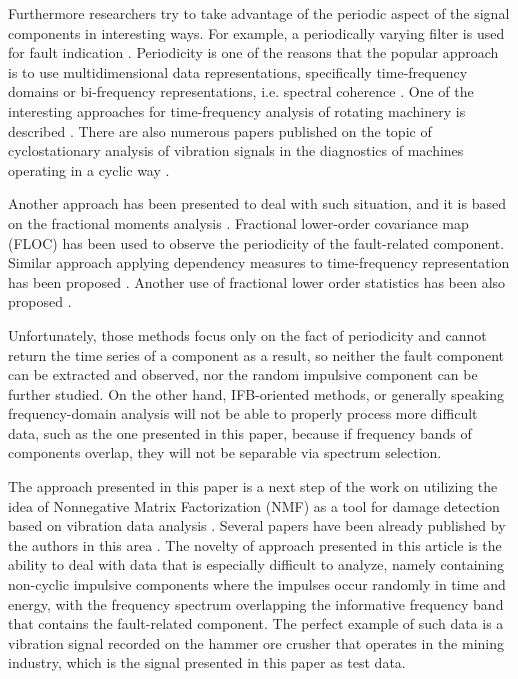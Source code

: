 \documentclass[3p,times]{elsarticle}
\begin{document}
Furthermore researchers try to take advantage of the periodic aspect of the signal components in interesting ways. For example, a periodically varying filter is used for fault indication \cite{kruczek2017cyclic}. Periodicity is one of the reasons that the popular approach is to use multidimensional data representations, specifically time-frequency domains or bi-frequency representations, i.e. spectral coherence \cite{randall2011rolling}. One of the interesting approaches for time-frequency analysis of rotating machinery is described \cite{feng2013recent}. There are also numerous papers published on the topic of cyclostationary analysis of vibration signals in the diagnostics of machines operating in a cyclic way \cite{Borghesani2017,antoni2009cyclostationarity,wodecki2019impulsive,biedka1996robust,zhao2019rolling}. 


Another approach has been presented to deal with such situation, and it is based on the fractional moments analysis \cite{zak2017alpha}. Fractional lower-order covariance map (FLOC) has been used to observe the periodicity of the fault-related component. Similar approach applying dependency measures to time-frequency representation has been proposed \cite{kruczek2020detect}. Another use of fractional lower order statistics has been also proposed \cite{ma1996joint}.

Unfortunately, those methods focus only on the fact of periodicity and cannot return the time series of a component as a result, so neither the fault component can be extracted and observed, nor the random impulsive component can be further studied. On the other hand, IFB-oriented methods, or generally speaking frequency-domain analysis will not be able to properly process more difficult data, such as the one presented in this paper, because if frequency bands of components overlap, they will not be separable via spectrum selection.


The approach presented in this paper is a next step of the work on utilizing the idea of Nonnegative Matrix Factorization (NMF) as a tool for damage detection based on vibration data analysis \cite{mehmood2013kernel,liang2019sparse,liang2020impulse,gu2020multi}. Several papers have been already published by the authors in this area \cite{wodecki2017local,wodecki2019novel,wodecki2019impulsive}. The novelty of approach presented in this article is the ability to deal with data that is especially difficult to analyze, namely containing non-cyclic impulsive components where the impulses occur randomly in time and energy, with the frequency spectrum overlapping the informative frequency band that contains the fault-related component. The perfect example of such data is a vibration signal recorded on the hammer ore crusher that operates in the mining industry, which is the signal presented in this paper as test data.
\end{document}
